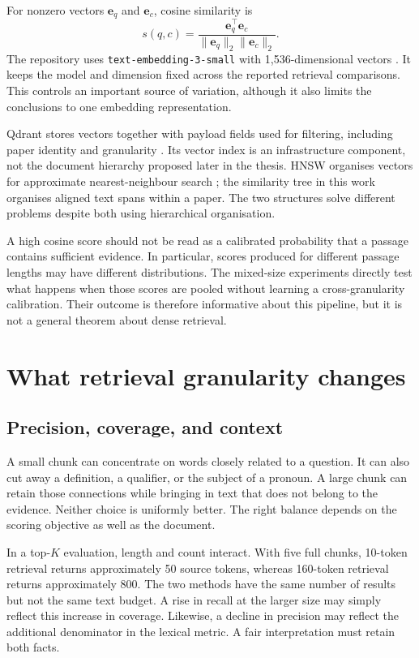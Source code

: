 For nonzero vectors $\mathbf{e}_q$ and $\mathbf{e}_c$, cosine similarity is
\begin{equation}
s(q,c)=\frac{\mathbf{e}_q^\top\mathbf{e}_c}
{\|\mathbf{e}_q\|_2\|\mathbf{e}_c\|_2}.
\label{eq:cosine}
\end{equation}
The repository uses \texttt{text-embedding-3-small} with 1,536-dimensional
vectors \cite{openai2024embeddings}. It keeps the model and dimension
fixed across the reported retrieval comparisons. This controls an
important source of variation, although it also limits the conclusions
to one embedding representation.

Qdrant stores vectors together with payload fields used for filtering,
including paper identity and granularity \cite{qdrantcollections}.
Its vector index is an infrastructure component, not the document
hierarchy proposed later in the thesis. HNSW organises vectors for
approximate nearest-neighbour search \cite{malkov2016hnsw}; the
similarity tree in this work organises aligned text spans within a
paper. The two structures solve different problems despite both using
hierarchical organisation.

A high cosine score should not be read as a calibrated probability that
a passage contains sufficient evidence. In particular, scores produced
for different passage lengths may have different distributions. The
mixed-size experiments directly test what happens when those scores
are pooled without learning a cross-granularity calibration. Their
outcome is therefore informative about this pipeline, but it is not a
general theorem about dense retrieval.

\section{What retrieval granularity changes}
\subsection{Precision, coverage, and context}
A small chunk can concentrate on words closely related to a question.
It can also cut away a definition, a qualifier, or the subject of a
pronoun. A large chunk can retain those connections while bringing in
text that does not belong to the evidence. Neither choice is uniformly
better. The right balance depends on the scoring objective as well as
the document.

In a top-$K$ evaluation, length and count interact. With five full chunks,
10-token retrieval returns approximately 50 source tokens, whereas
160-token retrieval returns approximately 800. The two methods have
the same number of results but not the same text budget. A rise in recall
at the larger size may simply reflect this increase in coverage.
Likewise, a decline in precision may reflect the additional denominator
in the lexical metric. A fair interpretation must retain both facts.

